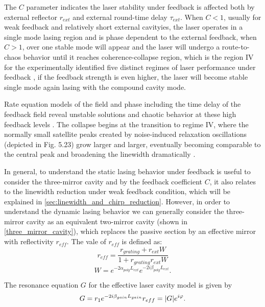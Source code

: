The $C$ parameter indicates the laser stability under feedback is affected both by external reflector $r_{ext}$ and external round-time delay $\tau_{ext}$. When $C<1$, usually for weak feedback and relatively short external cavityies, the laser operates in a single mode lasing region and is phase dependent to the external feedback, when $C>1$, over one stable mode will appear and the laser will undergo a route-to-chaos behavior until it reaches coherence-collapse \cite{} region, which is the region IV for the experimentally identified five distinct regimes of laser performance under feedback \cite{tkach1986regimes}, if the feedback strength is even higher, the laser will become stable single mode again lasing with the compound cavity mode.

Rate equation models of the field and phase including the time delay of the feedback field reveal unstable solutions and chaotic behavior at these high feedback levels \cite{tkach1986regimes}. The collapse begins at the transition to regime IV, where the normally small satellite peaks created by noise-induced relaxation oscillations (depicted in Fig. 5.23) grow larger and larger, eventually becoming comparable to the central peak and broadening the linewidth dramatically \cite{coldren2012diode}.

In general, to understand the static lasing behavior under feedback is useful to consider the three-mirror cavity and by the feedback coefficient $C$, it also relates to the linewidth reduction under weak feedback condition, which will be explained in \autoref{sec:linewidth_and_chirp_reduction}. However, in order to understand the dynamic lasing behavior we can generally consider the three-mirror cavity as an equivalent two-mirror cavity (shown in \autoref{three_mirror_cavity}), which replaces the passive section by an effective mirror with reflectivity $r_{eff}$. The vale of $r_{eff}$ is defined as:
\begin{equation}
    r_{eff}=\frac{r_{grating}+r_{ext}W}{1+r_{grating}r_{ext}W}
    \label{effective_reflectivity}
\end{equation}
\begin{equation}
    W=e^{-2\alpha_{poly}L_{ext}}e^{-2i\beta_{poly}L_{ext}}.
\end{equation}

The resonance equation $G$ for the effective laser cavity model is given by
\begin{equation}
    G=r_1e^{-2i\beta_{gain}L_{gain}}r_{eff}=\abs{G}e^{i\varphi}.
    \label{eq:RTG}
\end{equation}

